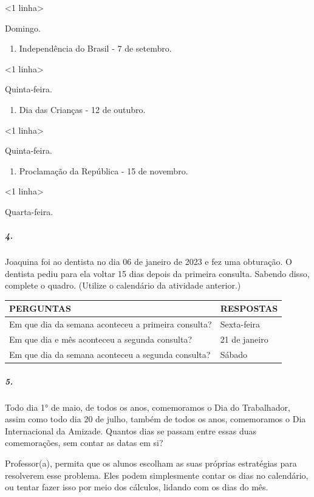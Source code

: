 \textless{}1 linha\textgreater{}

Domingo.

\begin{enumerate}
\def\labelenumi{\alph{enumi})}
\item
  Independência do Brasil - 7 de setembro.
\end{enumerate}

\textless{}1 linha\textgreater{}

Quinta-feira.

\begin{enumerate}
\def\labelenumi{\alph{enumi})}
\item
  Dia das Crianças - 12 de outubro.
\end{enumerate}

\textless{}1 linha\textgreater{}

Quinta-feira.

\begin{enumerate}
\def\labelenumi{\alph{enumi})}
\item
  Proclamação da República - 15 de novembro.
\end{enumerate}

\textless{}1 linha\textgreater{}

Quarta-feira.

\subparagraph{4.}\label{section-46}

Joaquina foi ao dentista no dia 06 de janeiro de 2023 e fez uma
obturação. O dentista pediu para ela voltar 15 dias depois da primeira
consulta. Sabendo disso, complete o quadro. (Utilize o calendário
da atividade anterior.)

\begin{longtable}[]{@{}ll@{}}
\toprule
PERGUNTAS & RESPOSTAS\tabularnewline
\midrule
\endhead
Em que dia da semana aconteceu a primeira consulta? & Sexta-feira\tabularnewline
Em que dia e mês aconteceu a segunda consulta? & 21 de
janeiro\tabularnewline
Em que dia da semana aconteceu a segunda consulta? &
Sábado\tabularnewline
\bottomrule
\end{longtable}

\subparagraph{5.}\label{section-47}

Todo dia 1° de maio, de todos os anos, comemoramos o Dia do Trabalhador,
assim como todo dia 20 de julho, também de todos os anos, comemoramos o
Dia Internacional da Amizade. Quantos dias se passam entre essas duas
comemorações, sem contar as datas em si?

Professor(a), permita que os alunos escolham as suas próprias
estratégias para resolverem esse problema. Eles podem simplesmente
contar os dias no calendário, ou tentar fazer isso por meio dos
cálculos, lidando com os dias do mês.

